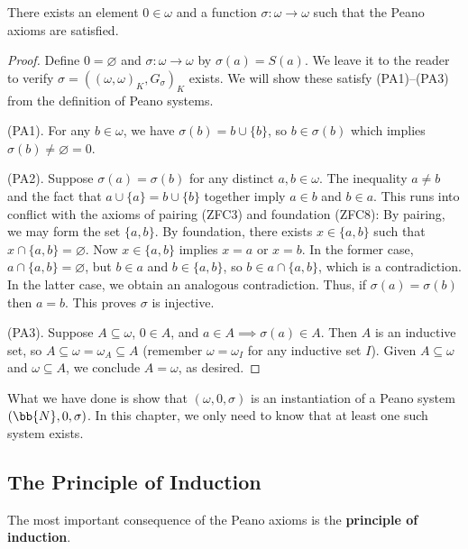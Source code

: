 \begin{prop}\label{ch1thm_nat_satisfy_Peano}
	There exists an element $0\in\omega$ and a function $\sigma:\omega\rightarrow\omega$ such that the Peano axioms are satisfied.
\end{prop}
\begin{proof}
	Define $0 = \varnothing$ and $\sigma:\omega\rightarrow\omega$ by $\sigma(a) = S(a)$. 
	We leave it to the reader to verify $\sigma = ((\omega, \omega)_{K}, G_{\sigma})_{K}$ exists.
	We will show these satisfy (PA1)--(PA3) from the definition of Peano systems. 
	
	(PA1).
	For any $b\in\omega$, we have $\sigma(b) = b\cup\{b\}$, so $b\in\sigma(b)$ which implies $\sigma(b)\ne\varnothing = 0$.
	
	(PA2).
	Suppose $\sigma(a) = \sigma(b)$ for any distinct $a, b\in\omega$. 
	The inequality $a\ne b$ and the fact that $a\cup\{a\} = b\cup\{b\}$ together imply $a\in b$ and $b\in a$. 
	This runs into conflict with the axioms of pairing (ZFC3) and foundation (ZFC8):
	By pairing, we may form the set $\{a, b\}$.
	By foundation, there exists $x\in\{a, b\}$ such that $x\cap\{a, b\} = \varnothing$.
	Now $x\in\{a, b\}$ implies $x=a$ or $x=b$. 
	In the former case, $a\cap \{a, b\} = \varnothing$, but $b\in a$ and $b\in\{a, b\}$, so $b\in a\cap \{a, b\}$, which is a contradiction.
	In the latter case, we obtain an analogous contradiction. 
	Thus, if $\sigma(a) = \sigma(b)$ then $a=b$. 
	This proves $\sigma$ is injective.
	
	(PA3).
	Suppose $A\subseteq\omega$, $0\in A$, and $a\in A\implies\sigma(a)\in A$.
	Then $A$ is an inductive set, so $A\subseteq\omega = \omega_{A}\subseteq A$ (remember $\omega = \omega_{I}$ for any inductive set $I$). 
	Given $A\subseteq\omega$ and $\omega\subseteq A$, we conclude $A = \omega$, as desired. 
\end{proof}

What we have done is show that $(\omega, 0, \sigma)$ is an instantiation of a Peano system $(\bb{N}, 0, \sigma)$. 
In this chapter, we only need to know that at least one such system exists. 



\subsection{The Principle of Induction}

The most important consequence of the Peano axioms is the \textbf{principle of induction}.

